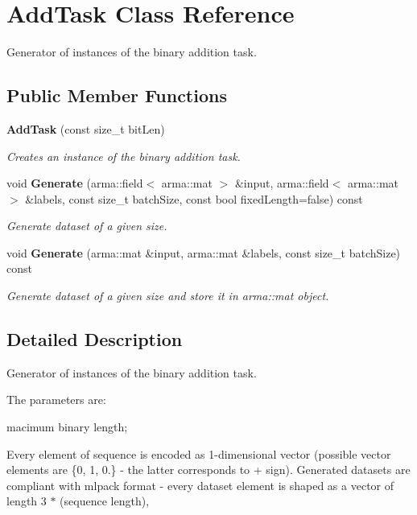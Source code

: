 \section{Add\+Task Class Reference}
\label{classmlpack_1_1ann_1_1augmented_1_1tasks_1_1AddTask}


Generator of instances of the binary addition task.  


\subsection*{Public Member Functions}
\begin{DoxyCompactItemize}
\item 
\textbf{ Add\+Task} (const size\+\_\+t bit\+Len)
\begin{DoxyCompactList}\small\item\em Creates an instance of the binary addition task. \end{DoxyCompactList}\item 
void \textbf{ Generate} (arma\+::field$<$ arma\+::mat $>$ \&input, arma\+::field$<$ arma\+::mat $>$ \&labels, const size\+\_\+t batch\+Size, const bool fixed\+Length=false) const
\begin{DoxyCompactList}\small\item\em Generate dataset of a given size. \end{DoxyCompactList}\item 
void \textbf{ Generate} (arma\+::mat \&input, arma\+::mat \&labels, const size\+\_\+t batch\+Size) const
\begin{DoxyCompactList}\small\item\em Generate dataset of a given size and store it in arma\+::mat object. \end{DoxyCompactList}\end{DoxyCompactItemize}


\subsection{Detailed Description}
Generator of instances of the binary addition task. 

The parameters are\+:
\begin{DoxyItemize}
\item macimum binary length;
\end{DoxyItemize}

Every element of sequence is encoded as 1-\/dimensional vector (possible vector elements are \{0, 1, 0.\} -\/ the latter corresponds to \textquotesingle{}+\textquotesingle{} sign\textquotesingle{}). Generated datasets are compliant with mlpack format -\/ every dataset element is shaped as a vector of length 3 $\ast$ (sequence length),

